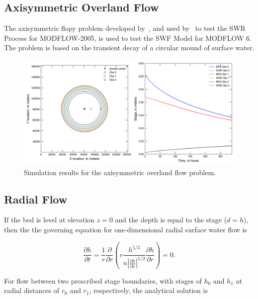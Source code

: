 \documentclass[fleqn]{article}
\begin{document}

\subsection{Axisymmetric Overland Flow}

The axisymmetric flopy problem developed by~\cite{lal2001}, and used by~\cite{hughes2015} to test the SWR Process for MODFLOW-2005, is used to test the SWF Model for MODFLOW 6.  The problem is based on the transient decay of a circular mound of surface water.



\begin{figure}[h!tbp]
	\centering
	\includegraphics[scale=0.70]{figures/axi-results.png}
	\caption[Simulation results for the axisymmetric overland flow problem.]{Simulation results for the axisymmetric overland flow problem.}
	\label{fig:axi-results}
\end{figure}

\subsection{Radial Flow}
If the bed is level at elevation $z = 0$ and the depth is equal to the stage ($d = h$), then the the governing equation for one-dimensional radial surface water flow is

\begin{equation}
  \frac{\partial h}{\partial t} = \frac{1}{r} \frac{\partial}{\partial r} 
  \left (r \frac{h^{5/3}}{n \left | \frac{\partial h}{\partial r} \right |^{1/2}} 
  \frac{\partial h}{\partial r} \right ) = 0 .
\end{equation}

\noindent For flow between two prescribed stage boundaries, with stages of $h_0$ and $h_1$ at radial distances of $r_0$ and $r_1$, respectively, the analytical solution is
\end{document}
